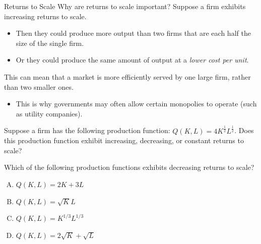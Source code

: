 \documentclass[11pt,t]{beamer}
\begin{document}
\begin{frame}{Returns to Scale}
  Why are returns to scale important? Suppose a firm exhibits increasing returns to scale.

  \begin{itemize}
    \item Then they could produce more output than two firms that are each half the size of the single firm.

    \item Or they could produce the same amount of output at a \textit{lower cost per unit}.
  \end{itemize}

  \bigskip
  This can mean that a market is more efficiently served by one large firm, rather than two smaller ones.

  \begin{itemize}
    \item This is why governments may often allow certain monopolies to operate (such as utility companies).
  \end{itemize}
\end{frame}

\begin{frame}
  
  \bigskip
  Suppose a firm has the following production function: $Q(K,L) = 4K^{\frac{1}{2}}L^{\frac{1}{2}}$. Does this production function exhibit increasing, decreasing, or constant returns to scale?
\end{frame}

\begin{frame}

  \bigskip
  Which of the following production functions exhibits decreasing returns to scale?

  \bigskip
  \begin{enumerate}[A)]
    \item $Q(K,L) = 2K+3L$
    \item $Q(K,L) = \sqrt{K}L$
    \item $Q(K,L) = K^{1/3}L^{1/3}$
    \item $Q(K,L) = 2\sqrt{K} + \sqrt{L}$
  \end{enumerate}
\end{frame}
\end{document}
